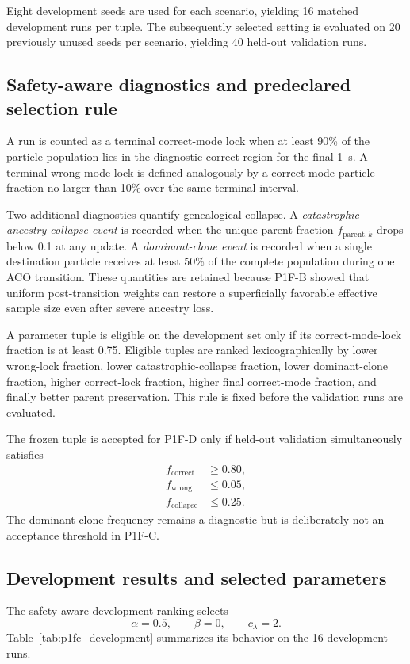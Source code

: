 Eight development seeds are used for each scenario, yielding 16 matched development runs per tuple. The subsequently selected setting is evaluated on 20 previously unused seeds per scenario, yielding 40 held-out validation runs.

\subsection{Safety-aware diagnostics and predeclared selection rule}
A run is counted as a terminal correct-mode lock when at least 90\% of the particle population lies in the diagnostic correct region for the final \SI{1}{s}. A terminal wrong-mode lock is defined analogously by a correct-mode particle fraction no larger than 10\% over the same terminal interval.

Two additional diagnostics quantify genealogical collapse. A \emph{catastrophic ancestry-collapse event} is recorded when the unique-parent fraction $f_{\mathrm{parent},k}$ drops below 0.1 at any update. A \emph{dominant-clone event} is recorded when a single destination particle receives at least 50\% of the complete population during one ACO transition. These quantities are retained because P1F-B showed that uniform post-transition weights can restore a superficially favorable effective sample size even after severe ancestry loss.

A parameter tuple is eligible on the development set only if its correct-mode-lock fraction is at least 0.75. Eligible tuples are ranked lexicographically by lower wrong-lock fraction, lower catastrophic-collapse fraction, lower dominant-clone fraction, higher correct-lock fraction, higher final correct-mode fraction, and finally better parent preservation. This rule is fixed before the validation runs are evaluated.

The frozen tuple is accepted for P1F-D only if held-out validation simultaneously satisfies
\begin{align}
    f_{\mathrm{correct}} &\ge 0.80,\\
    f_{\mathrm{wrong}} &\le 0.05,\\
    f_{\mathrm{collapse}} &\le 0.25.
\end{align}
The dominant-clone frequency remains a diagnostic but is deliberately not an acceptance threshold in P1F-C.

\subsection{Development results and selected parameters}
The safety-aware development ranking selects
\begin{equation}
    \boxed{\alpha=0.5,\qquad \beta=0,\qquad c_\lambda=2.}
\end{equation}
Table~\ref{tab:p1fc_development} summarizes its behavior on the 16 development runs.

